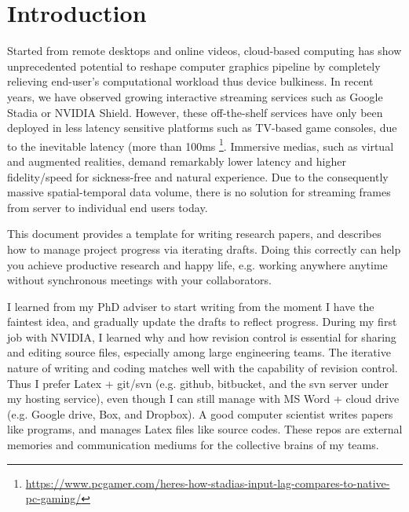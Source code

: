 \section{Introduction}


Started from remote desktops and online videos, cloud-based computing has show unprecedented potential to reshape computer graphics pipeline by completely relieving end-user's computational workload thus device bulkiness. In recent years, we have observed growing interactive streaming services such as Google Stadia or NVIDIA Shield. 
However, these off-the-shelf services have only been deployed in less latency sensitive platforms such as TV-based game consoles, due to the inevitable latency (more than 100ms \footnote{\url{https://www.pcgamer.com/heres-how-stadias-input-lag-compares-to-native-pc-gaming/}}. Immersive medias, such as virtual and augmented realities, demand remarkably lower latency and higher fidelity/speed for sickness-free and natural experience. Due to the consequently massive spatial-temporal data volume, there is no solution for streaming frames from server to individual end users today.




This document provides a template for writing research papers, and describes how to manage project progress via iterating drafts.
Doing this correctly can help you achieve productive research and happy life, e.g. working anywhere anytime without synchronous meetings with your collaborators.


I learned from my PhD adviser to start writing from the moment I have the faintest idea, and gradually update the drafts to reflect progress.
During my first job with NVIDIA, I learned why and how revision control is essential for sharing and editing source files, especially among large engineering teams.
The iterative nature of writing and coding matches well with the capability of revision control.
Thus I prefer Latex + git/svn (e.g. github, bitbucket, and the svn server under my hosting service), even though I can still manage with MS Word + cloud drive (e.g. Google drive, Box, and Dropbox). 
A good computer scientist writes papers like programs, and manages Latex files like source codes.
These repos are external memories and communication mediums for the collective brains of my teams.

